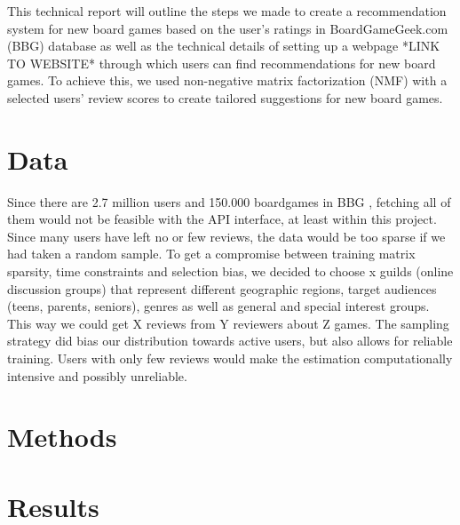 \documentclass[a4paper,12pt,bibliography=totoc,numbers=noenddot,sfdefaults=false,abstract=true,notitlepage]{scrartcl} %
\begin{document}
	This technical report will outline the steps we made to create a recommendation system for new board games based on the user's ratings in BoardGameGeek.com (BBG) database as well as the technical details of setting up a webpage *LINK TO WEBSITE* through which users can find recommendations for new board games. To achieve this, we used non-negative matrix factorization (NMF) with a selected users' review scores to create tailored suggestions for new board games.
	
	
	
	
	\section{Data}\label{data}


	Since there are 2.7 million users  and 150.000 boardgames in BBG \autocite{didymus-trueBoardGameGeeksSupportDrive2024,wordsratedBoardGamesStatistics2025}, fetching all of them would not be feasible with the API interface, at least within this project. Since many users have left no or few reviews, the data would be too sparse if we had taken a random sample. To get a compromise between training matrix sparsity, time constraints and selection bias, we decided to choose x guilds (online discussion groups) that represent different geographic regions, target audiences (teens, parents, seniors), genres as well as general and special interest groups. This way we could get X reviews from Y reviewers about Z games. The sampling strategy did bias our distribution towards active users, but also allows for reliable training. Users with only few reviews would make the estimation computationally intensive and possibly unreliable.

	\section{Methods}\label{methods}
	
	
	

	
	
	\section{Results}\label{results}
	
\end{document}
